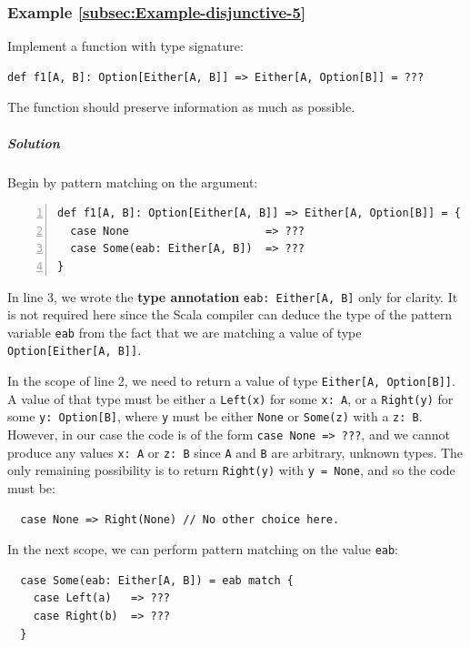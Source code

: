 \subsubsection{Example \label{subsec:Example-disjunctive-5}\ref{subsec:Example-disjunctive-5}}

Implement a function with type signature:
\begin{lstlisting}
def f1[A, B]: Option[Either[A, B]] => Either[A, Option[B]] = ???
\end{lstlisting}
The function should preserve information as much as possible.

\subparagraph{Solution}

Begin by pattern matching on the argument:
\begin{lstlisting}[numbers=left]
def f1[A, B]: Option[Either[A, B]] => Either[A, Option[B]] = {
  case None                     => ???
  case Some(eab: Either[A, B])  => ???
}
\end{lstlisting}
In line 3, we wrote the \textbf{type annotation}
\lstinline!eab: Either[A, B]! only for clarity. It is not required
here since the Scala compiler can deduce the type of the pattern variable
\lstinline!eab! from the fact that we are matching a value of type
\lstinline!Option[Either[A, B]]!.

In the scope of line 2, we need to return a value of type \lstinline!Either[A, Option[B]]!.
A value of that type must be either a \lstinline!Left(x)! for some
\lstinline!x: A!, or a \lstinline!Right(y)! for some \lstinline!y: Option[B]!,
where \lstinline!y! must be either \lstinline!None! or \lstinline!Some(z)!
with a \lstinline!z: B!. However, in our case the code is of the
form \lstinline!case None => ???!, and we cannot produce any values
\lstinline!x: A! or \lstinline!z: B! since \lstinline!A! and \lstinline!B!
are arbitrary, unknown types. The only remaining possibility is to
return \lstinline!Right(y)! with \lstinline!y = None!, and so the
code must be:
\begin{lstlisting}
  case None => Right(None) // No other choice here.
\end{lstlisting}

In the next scope, we can perform pattern matching on the value \lstinline!eab!:
\begin{lstlisting}
  case Some(eab: Either[A, B]) = eab match {
    case Left(a)   => ???
    case Right(b)  => ???
  }
\end{lstlisting}

